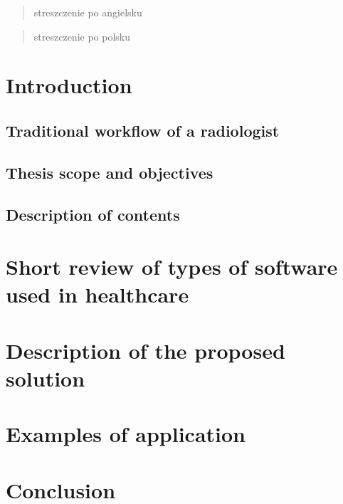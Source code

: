 \documentclass[12pt, twoside, openany]{report}
\theoremstyle{definition}
\begin{document}
\thispagestyle{empty}
\newpage
\pagestyle{headings}
\setcounter{page}{1}
\begin{otherlanguage}{british}
\begin{abstract}
    streszczenie po angielsku
\end{abstract}
\end{otherlanguage}

\begin{otherlanguage}{polish}
\begin{abstract}
streszczenie po polsku
\end{abstract}
\end{otherlanguage}


\chapter{Introduction}
\section{Traditional workflow of a radiologist}


\section{Thesis scope and objectives}
\section{Description of contents}
\chapter{Short review of types of software used in healthcare}
\chapter{Description of the proposed solution}
\chapter{Examples of application}

\chapter{Conclusion}


\end{document}
